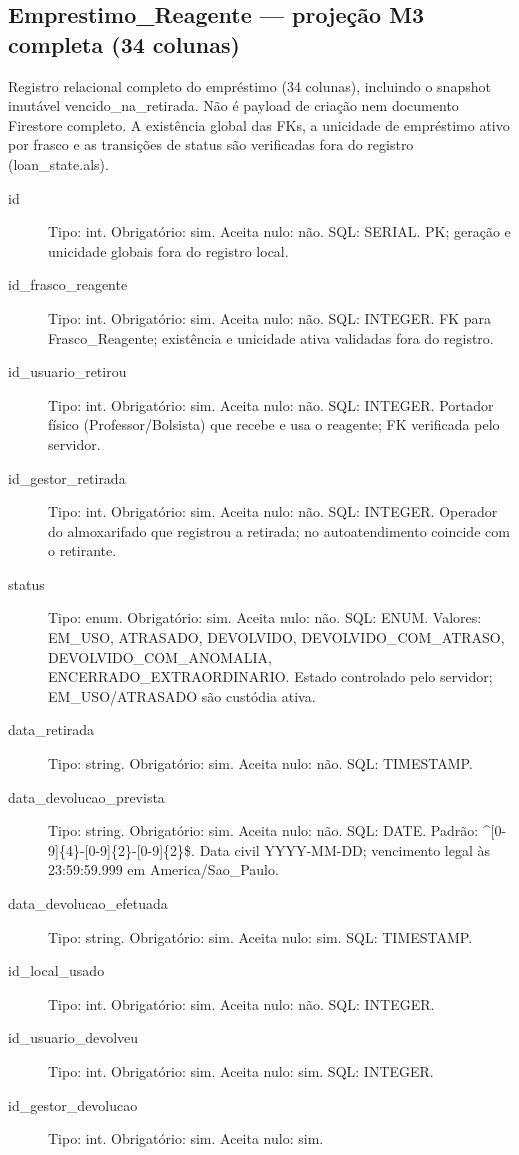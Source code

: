 \subsection*{Emprestimo\_Reagente --- projeção M3 completa (34 colunas)}
Registro relacional completo do empréstimo (34 colunas), incluindo o snapshot imutável vencido\_na\_retirada. Não é payload de criação nem documento Firestore completo. A existência global das FKs, a unicidade de empréstimo ativo por frasco e as transições de status são verificadas fora do registro (loan\_state.als).
\begin{description}
\item[id] Tipo: int. Obrigatório: sim. Aceita nulo: não.
SQL: SERIAL.
PK; geração e unicidade globais fora do registro local.
\item[id\_frasco\_reagente] Tipo: int. Obrigatório: sim. Aceita nulo: não.
SQL: INTEGER.
FK para Frasco\_Reagente; existência e unicidade ativa validadas fora do registro.
\item[id\_usuario\_retirou] Tipo: int. Obrigatório: sim. Aceita nulo: não.
SQL: INTEGER.
Portador físico (Professor/Bolsista) que recebe e usa o reagente; FK verificada pelo servidor.
\item[id\_gestor\_retirada] Tipo: int. Obrigatório: sim. Aceita nulo: não.
SQL: INTEGER.
Operador do almoxarifado que registrou a retirada; no autoatendimento coincide com o retirante.
\item[status] Tipo: enum. Obrigatório: sim. Aceita nulo: não.
SQL: ENUM.
Valores: EM\_USO, ATRASADO, DEVOLVIDO, DEVOLVIDO\_COM\_ATRASO, DEVOLVIDO\_COM\_ANOMALIA, ENCERRADO\_EXTRAORDINARIO.
Estado controlado pelo servidor; EM\_USO/ATRASADO são custódia ativa.
\item[data\_retirada] Tipo: string. Obrigatório: sim. Aceita nulo: não.
SQL: TIMESTAMP.
\item[data\_devolucao\_prevista] Tipo: string. Obrigatório: sim. Aceita nulo: não.
SQL: DATE.
Padrão: \textasciicircum{}[0-9]\{4\}-[0-9]\{2\}-[0-9]\{2\}\$.
Data civil YYYY-MM-DD; vencimento legal às 23:59:59.999 em America/Sao\_Paulo.
\item[data\_devolucao\_efetuada] Tipo: string. Obrigatório: sim. Aceita nulo: sim.
SQL: TIMESTAMP.
\item[id\_local\_usado] Tipo: int. Obrigatório: sim. Aceita nulo: não.
SQL: INTEGER.
\item[id\_usuario\_devolveu] Tipo: int. Obrigatório: sim. Aceita nulo: sim.
SQL: INTEGER.
\item[id\_gestor\_devolucao] Tipo: int. Obrigatório: sim. Aceita nulo: sim.

\end{description}
